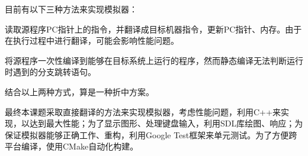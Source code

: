 \documentclass[a4paper]{ltxdoc}
\begin{document}
{目前有以下三种方法来实现模拟器：
\begin{description}[align=left]
	\item [直接翻译] 读取源程序PC指针上的指令，并翻译成目标机器指令，更新PC指针、内存。由于在执行过程中进行翻译，可能会影响性能问题。
	\item [静态编译] 将源程序一次性编译到能够在目标系统上运行的程序，然而静态编译无法判断运行时遇到的分支跳转语句。
	\item [动态编译] 结合以上两种方式，算是一种折中方案。
\end{description}

最终本课题采取直接翻译的方法来实现模拟器，考虑性能问题，利用C++来实现，以达到最大性能；为了显示图形、处理键盘输入，利用SDL库绘图、响应；为保证模拟器能够正确工作、重构，利用Google Test框架来单元测试。为了方便跨平台编译，使用CMake自动化构建。

}
\end{document}
